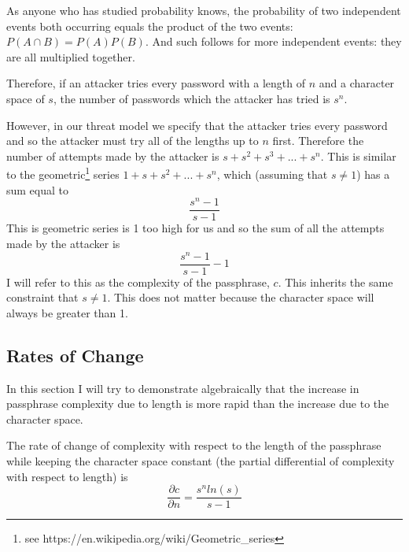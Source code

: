 \documentclass[11pt,a4paper]{article}
\begin{document}
As anyone who has studied probability knows, the probability of two independent events both occurring equals the product of the two events: $P(A \cap B)=P(A)P(B)$. And such follows for more independent events: they are all multiplied together.


Therefore, if an attacker tries every password with a length of $n$ and a character space of $s$, the number of passwords which the attacker has tried is $s^n$.

However, in our threat model we specify that the attacker tries every password and so the attacker must try all of the lengths up to $n$ first. Therefore the number of attempts made by the attacker is $s + s^2 + s^3 +...+s^n$. This is similar to the geometric\footnote{see https://en.wikipedia.org/wiki/Geometric\_series} series $1 + s + s^2 +...+s^n$, which (assuming that $s \ne 1$) has a sum equal to \[\frac{s^n - 1}{s-1}\]This is geometric series is 1 too high for us and so the sum of all the attempts made by the attacker is \[\frac{s^n - 1}{s-1} -1\]I will refer to this as the complexity of the passphrase, $c$. This inherits the same constraint that $s \ne 1$. This does not matter because the character space will always be greater than 1.

\subsection{Rates of Change}
In this section I will try to demonstrate algebraically that the increase in passphrase complexity due to length is more rapid than the increase due to the character space. 

The rate of change of complexity with respect to the length of the passphrase while keeping the character space constant (the partial differential of complexity with respect to length) is \[ \frac{\partial c}{\partial n} = \frac{s^n ln(s)}{s-1}\]
\end{document}
